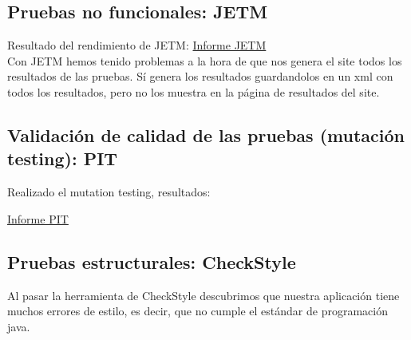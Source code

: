 \documentclass[DIV=calc,paper=a4,fontsize=11pt,onecolumn]{scrartcl} %
\begin{document}
	\subsection{Pruebas no funcionales: JETM}
	Resultado del rendimiento de JETM:
	\href{Informes/SiteTestInicial/jetm-timing-report.html}{Informe JETM} \\
	
	Con JETM hemos tenido problemas  a la hora de que nos genera el site todos los resultados de las pruebas. Sí genera los resultados guardandolos en un xml con todos los resultados, pero no los muestra en la página de resultados del site.
	\subsection{Validación de calidad de las pruebas (mutación testing): PIT}
	Realizado el mutation testing, resultados:
	
	\href{Informes/pit-reports/index.html}{Informe PIT} \\
	
	\subsection{Pruebas estructurales: CheckStyle}
	Al pasar la herramienta de CheckStyle descubrimos que nuestra aplicación tiene muchos errores de estilo, es decir, que no cumple el estándar de programación java.
	
\end{document}

